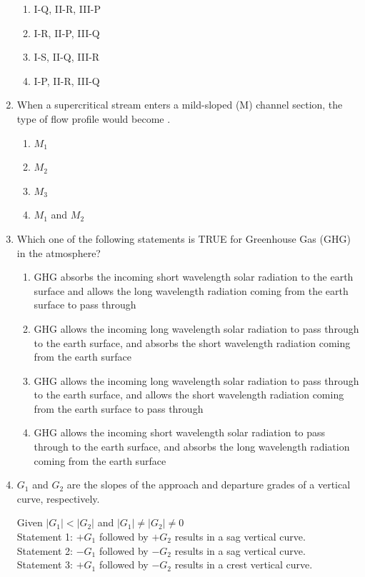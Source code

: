 \documentclass[journal,12pt,onecolumn]{IEEEtran}
\theoremstyle{remark}
\begin{document}
\begin{enumerate}
\begin{enumerate}
\item I-Q, II-R, III-P
\item I-R, II-P, III-Q
\item I-S, II-Q, III-R
\item I-P, II-R, III-Q
\end{enumerate}

\item When a supercritical stream enters a mild-sloped (M) channel section, the type of flow profile would become \underline{\hspace{2cm}}.

\hfill{}
\begin{enumerate}
\item $M_1$
\item $M_2$
\item $M_3$
\item $M_1$ and $M_2$
\end{enumerate}

\item Which one of the following statements is TRUE for Greenhouse Gas (GHG) in the atmosphere?

\hfill{}
\begin{enumerate}
\item GHG absorbs the incoming short wavelength solar radiation to the earth surface and allows the long wavelength radiation coming from the earth surface to pass through
\item GHG allows the incoming long wavelength solar radiation to pass through to the earth surface, and absorbs the short wavelength radiation coming from the earth surface
\item GHG allows the incoming long wavelength solar radiation to pass through to the earth surface, and allows the short wavelength radiation coming from the earth surface to pass through
\item GHG allows the incoming short wavelength solar radiation to pass through to the earth surface, and absorbs the long wavelength radiation coming from the earth surface
\end{enumerate}

\item $G_1$ and $G_2$ are the slopes of the approach and departure grades of a vertical curve, respectively.

Given $|G_1| < |G_2|$ and $|G_1| \neq |G_2| \neq 0$\\
Statement 1: $+G_1$ followed by $+G_2$ results in a sag vertical curve.\\
Statement 2: $-G_1$ followed by $-G_2$ results in a sag vertical curve.\\
Statement 3: $+G_1$ followed by $-G_2$ results in a crest vertical curve.\\


\end{enumerate}
\end{document}
